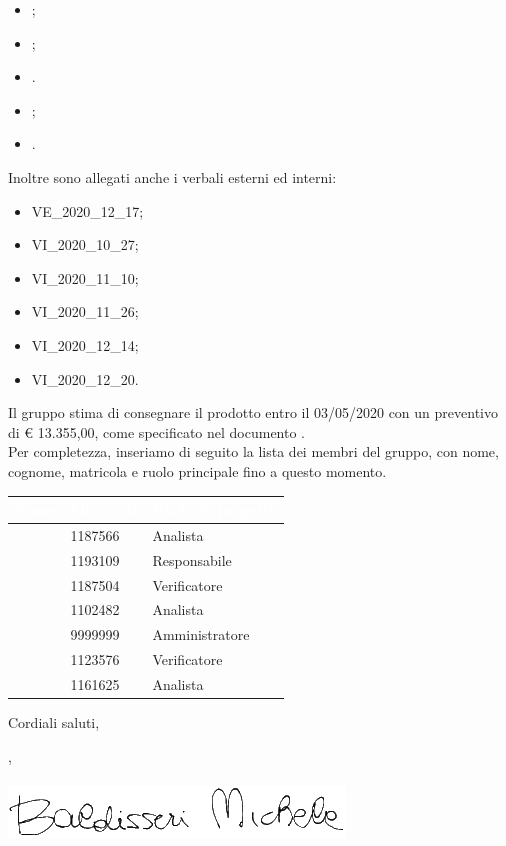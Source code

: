 \documentclass[11pt]{letter}
\begin{document}
\begin{letter}
\begin{itemize}
            \item {};
            \item {};
            \item {}.
            \item {};
            \item {}.
        \end{itemize}
        Inoltre sono allegati anche i verbali esterni ed interni:
        \begin{itemize}
            \item VE\_2020\_12\_17;
            \item VI\_2020\_10\_27;
            \item VI\_2020\_11\_10;
            \item VI\_2020\_11\_26;
            \item VI\_2020\_12\_14;
            \item VI\_2020\_12\_20.
        \end{itemize}
        Il gruppo stima di consegnare il prodotto entro il 03/05/2020 con un preventivo di \euro{} 13.355,00, come specificato nel documento .\\
        Per completezza, inseriamo di seguito la lista dei membri del gruppo, con nome, cognome, matricola e ruolo principale fino a questo momento.
        {
            \renewcommand{\arraystretch}{2}
            \begin{longtable}{ C{4cm} C{4cm} C{4cm}}
                \textcolor{white}{\textbf{Nome}} & \textcolor{white}{\textbf{Matricola}} & \textcolor{white}{\textbf{Ruolo di progetto}}\\
                \endhead 
                \SG{} & 1187566 & Analista \\
                \BM{} & 1193109 & Responsabile \\
                \RA{} & 1187504 & Verificatore \\
                \SH{} & 1102482 & Analista \\
                \PA{} & 9999999 & Amministratore \\
                \ZM{} & 1123576 & Verificatore \\
                \SP{} & 1161625 & Analista \\
            \end{longtable}
        }
        Cordiali saluti,
        \begin{flushright}
        	\closing{\BM{}, \\ \textit{\Responsabile{}} \\\includegraphics[width=.6\linewidth]{Utility/Images/firmaBM.png}} 
        \end{flushright}
    \end{letter}
\end{document}
